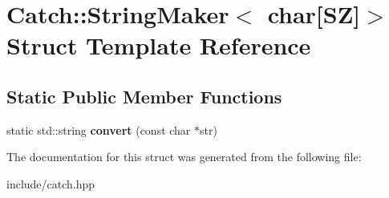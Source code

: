 \hypertarget{structCatch_1_1StringMaker_3_01char[SZ]_4}{}\section{Catch\+:\+:String\+Maker$<$ char\mbox{[}SZ\mbox{]}$>$ Struct Template Reference}
\label{structCatch_1_1StringMaker_3_01char[SZ]_4}
\subsection*{Static Public Member Functions}
\begin{DoxyCompactItemize}
\item 
static std\+::string {\bfseries convert} (const char $\ast$str)\hypertarget{structCatch_1_1StringMaker_3_01char[SZ]_4_ab4938ae9fbc5e01cf6a3be615519cefd}{}\label{structCatch_1_1StringMaker_3_01char[SZ]_4_ab4938ae9fbc5e01cf6a3be615519cefd}

\end{DoxyCompactItemize}


The documentation for this struct was generated from the following file\+:\begin{DoxyCompactItemize}
\item 
include/catch.\+hpp\end{DoxyCompactItemize}
